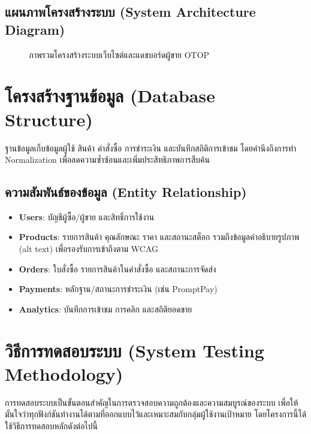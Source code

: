 \subsection{แผนภาพโครงสร้างระบบ (System Architecture Diagram)}
\begin{figure}[h]
  \centering
  \caption[System architecture]{ภาพรวมโครงสร้างระบบเว็บไซต์และแดชบอร์ดผู้ขาย OTOP}
  \label{fig:system-architecture}
\end{figure}

\section{โครงสร้างฐานข้อมูล (Database Structure)}
ฐานข้อมูลเก็บข้อมูลผู้ใช้ สินค้า คำสั่งซื้อ การชำระเงิน และบันทึกสถิติการเข้าชม \cite{pressman2014}
โดยคำนึงถึงการทำ Normalization เพื่อลดความซ้ำซ้อนและเพิ่มประสิทธิภาพการสืบค้น

\subsection{ความสัมพันธ์ของข้อมูล (Entity Relationship)}
\begin{itemize}
  \item \textbf{Users}: บัญชีผู้ซื้อ/ผู้ขาย และสิทธิ์การใช้งาน \cite{pressman2014}
  \item \textbf{Products}: รายการสินค้า คุณลักษณะ ราคา และสถานะสต็อก 
  รวมถึงข้อมูลคำอธิบายรูปภาพ (alt text) เพื่อรองรับการเข้าถึงตาม WCAG \cite{ecommerce2019}
  \item \textbf{Orders}: ใบสั่งซื้อ รายการสินค้าในคำสั่งซื้อ และสถานะการจัดส่ง \cite{ecommerce2019}
  \item \textbf{Payments}: หลักฐาน/สถานะการชำระเงิน (เช่น PromptPay) \cite{promptpay2021}
  \item \textbf{Analytics}: บันทึกการเข้าชม การคลิก และสถิติยอดขาย \cite{otop2020}
\end{itemize}

\section{วิธีการทดสอบระบบ (System Testing Methodology)}

การทดสอบระบบเป็นขั้นตอนสำคัญในการตรวจสอบความถูกต้องและความสมบูรณ์ของระบบ 
เพื่อให้มั่นใจว่าทุกฟังก์ชันทำงานได้ตามที่ออกแบบไว้และเหมาะสมกับกลุ่มผู้ใช้งานเป้าหมาย 
โดยโครงการนี้ได้ใช้วิธีการทดสอบหลักดังต่อไปนี้

